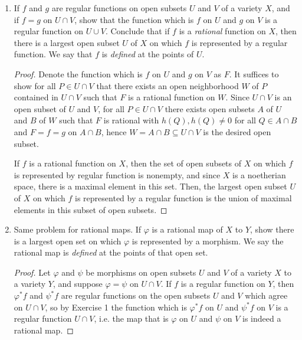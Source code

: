 \documentclass[12pt]{article}
\theoremstyle{definition}
\begin{document}
\begin{enumerate} [label=\textbf{\arabic*.}, leftmargin=-0.05em]

\item If $f$ and $g$ are regular functions on open subsets $U$ and $V$ of a variety $X$, and if $f = g$ on $U \cap V$, show that the function which is $f$ on $U$ and $g$ on $V$ is a regular function on $U \cup V$. Conclude that if $f$ is a \textit{rational} function on $X$, then there is a largest open subset $U$ of $X$ on which $f$ is represented by a regular function. We say that $f$ is \textit{defined} at the points of $U$.

\begin{proof}
    Denote the function which is $f$ on $U$ and $g$ on $V$ as $F$. It suffices to show for all $P \in U \cap V$ that there exists an open neighborhood $W$ of $P$ contained in $U \cap V$ such that $F$ is a rational function on $W$. Since $U \cap V$ is an open subset of $U$ and $V$, for all $P \in U \cap V$ there exists open subsets $A$ of $U$ and $B$ of $W$ such that $F$ is rational with $h(Q), h(Q) \neq 0$ for all $Q \in A \cap B$ and $F = f = g$ on $A \cap B$, hence $W = A \cap B \subseteq U \cap V$ is the desired open subset.
    
    If $f$ is a rational function on $X$, then the set of open subsets of $X$ on which $f$ is represented by regular function is nonempty, and since $X$ is a noetherian space, there is a maximal element in this set. Then, the largest open subset $U$ of $X$ on which $f$ is represented by a regular function is the union of maximal elements in this subset of open subsets.
\end{proof}

\item Same problem for rational maps. If $\varphi$ is a rational map of $X$ to $Y$, show there is a largest open set on which $\varphi$ is represented by a morphism. We say the rational map is \textit{defined} at the points of that open set.

\begin{proof}
    Let $\varphi$ and $\psi$ be morphisms on open subsets $U$ and $V$ of a variety $X$ to a variety $Y$, and suppose $\varphi = \psi$ on $U \cap V$. If $f$ is a regular function on $Y$, then $\varphi^*f$ and $\psi^*f$ are regular functions on the open subsets $U$ and $V$ which agree on $U \cap V$, so by Exercise 1 the function which is $\varphi^*f$ on $U$ and $\psi^*f$ on $V$ is a regular function $U \cap V$, i.e. the map that is $\varphi$ on $U$ and $\psi$ on $V$ is indeed a rational map.


\end{proof}
\end{enumerate}
\end{document}
